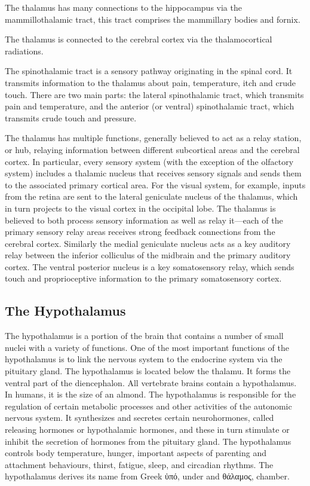 The thalamus has many connections to the hippocampus via the mammillothalamic tract, this tract comprises the mammillary bodies and fornix.

The thalamus is connected to the cerebral cortex via the thalamocortical radiations.

The spinothalamic tract is a sensory pathway originating in the spinal cord. It transmits information to the thalamus about pain, temperature, itch and crude touch. There are two main parts: the lateral spinothalamic tract, which transmits pain and temperature, and the anterior (or ventral) spinothalamic tract, which transmits crude touch and pressure.

The thalamus has multiple functions, generally believed to act as a relay station, or hub, relaying information between different subcortical areas and the cerebral cortex. In particular, every sensory system (with the exception of the olfactory system) includes a thalamic nucleus that receives sensory signals and sends them to the associated primary cortical area. For the visual system, for example, inputs from the retina are sent to the lateral geniculate nucleus of the thalamus, which in turn projects to the visual cortex in the occipital lobe. The thalamus is believed to both process sensory information as well as relay it---each of the primary sensory relay areas receives strong feedback connections from the cerebral cortex. Similarly the medial geniculate nucleus acts as a key auditory relay between the inferior colliculus of the midbrain and the primary auditory cortex. The ventral posterior nucleus is a key somatosensory relay, which sends touch and proprioceptive information to the primary somatosensory cortex.

\hypertarget{the-hypothalamus}{%
\subsection{The Hypothalamus}\label{the-hypothalamus}}

The hypothalamus is a portion of the brain that contains a number of small nuclei with a variety of functions. One of the most important functions of the hypothalamus is to link the nervous system to the endocrine system via the pituitary gland. The hypothalamus is located below the thalamu. It forms the ventral part of the diencephalon. All vertebrate brains contain a hypothalamus. In humans, it is the size of an almond. The hypothalamus is responsible for the regulation of certain metabolic processes and other activities of the autonomic nervous system. It synthesizes and secretes certain neurohormones, called releasing hormones or hypothalamic hormones, and these in turn stimulate or inhibit the secretion of hormones from the pituitary gland. The hypothalamus controls body temperature, hunger, important aspects of parenting and attachment behaviours, thirst, fatigue, sleep, and circadian rhythms. The hypothalamus derives its name from Greek ὑπό, under and θάλαμος, chamber.

